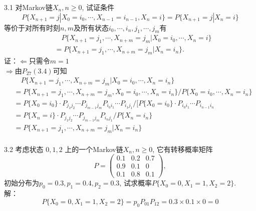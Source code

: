 

3.1 对Markov链$X_n, n \geqslant 0$, 试证条件
	\[
	P\{X_{n+1} = j | X_0 = i_0, \cdots , X_{n-1} = i_{n-1}, X_n = i\} = P\{X_{n+1} = j | X_n = i\}
	\]
	等价于对所有时刻$n, m$及所有状态$i_0, \cdots, i_n, j_1, \cdots, j_m$有
	\[
	\begin{split}
	& \quad P\{X_{n+1} = j_1, \cdots, X_{n+m} = j_m | X_0 = i_0, \cdots, X_n = i\}\\
	& = P\{X_{n+1} = j_1, \cdots, X_{n+m} = j_m | X_n = i_n\}.
	\end{split}
	\]
证：$\Leftarrow $只需令$m=1$\\
	$\Rightarrow $由$P_{27}(3.4)$可知\\
	\[
	\begin{split}
	& \quad P\{X_{n+1} = j_1, \cdots, X_{n+m} = j_m | X_0 = i_0, \cdots, X_n = i_n\}\\
	& = P\{X_{n+1} = j_1, \cdots, X_{n+m} = j_m , X_0 = i_0, \cdots, X_n = i_n\} / P\{X_0 = i_0, \cdots, X_n = i_n\}\\
	& = P\{X_0 = i_0\} \cdot P_{j_1j_2} \cdots P_{j_{m-1}j_m} P_{i_0i_1} \cdots P_{i_1j_1} / [P\{X_0 = i_0\} \cdot P_{i_0i_1} \cdots P_{i_{n-1}i_n}\\
	& = P\{X_n = i\} \cdot P_{j_1j_2} \cdots P_{j_{m-1}j_m} P_{i_nj_1} / P\{X_n = i_n\}\\
	& = P\{X_{n+1} = j_1, \cdots, X_{n+m} = j_m | X_n = i_n\}\\
	\end{split}
	\]


3.2 考虑状态 $ 0,1,2 $ 上的一个Markov链$X_n, n \geqslant 0$, 它有转移概率矩阵
	\[
	P = \begin{pmatrix}
	0.1 & 0.2 & 0.7 \\
	0.9 & 0.1 & 0 \\
	0.1 & 0.8 & 0.1
	\end{pmatrix} ,
	\]
	初始分布为$p_0 = 0.3, p_1 = 0.4, p_2 = 0.3$, 试求概率$P\{X_0 = 0, X_1 = 1, X_2 = 2\}$.\\
解：
	\[
	P\{X_0 = 0, X_1 = 1, X_2 = 2\} = p_0P_{01}P_{12} = 0.3 \times 0.1 \times 0 = 0
	\]


